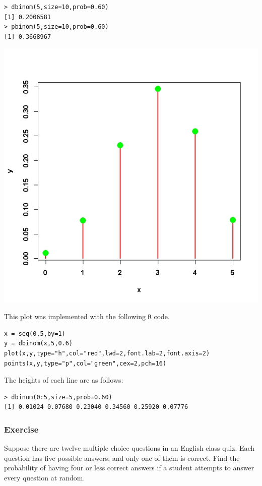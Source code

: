 \documentclass[a4paper,12pt]{article}
\begin{document}
\begin{verbatim}
> dbinom(5,size=10,prob=0.60)
[1] 0.2006581
> pbinom(5,size=10,prob=0.60)
[1] 0.3668967
\end{verbatim}

 \begin{center}
 \includegraphics[scale=0.50]{dbinomPlot}
 \end{center}
 
This plot was implemented with the following \texttt{R} code.
\begin{framed}
\begin{verbatim}
x = seq(0,5,by=1)
y = dbinom(x,5,0.6)
plot(x,y,type="h",col="red",lwd=2,font.lab=2,font.axis=2)
points(x,y,type="p",col="green",cex=2,pch=16)
\end{verbatim}
\end{framed}
The heights of each line are as follows:
\begin{verbatim}
> dbinom(0:5,size=5,prob=0.60)
[1] 0.01024 0.07680 0.23040 0.34560 0.25920 0.07776
\end{verbatim}

\subsubsection{Exercise}
Suppose there are twelve multiple choice questions in an English class quiz. Each question has five possible answers, and only one of them is correct. Find the probability of having four or less correct answers if a student attempts to answer every question at random. 
\end{document}
